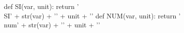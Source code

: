 \begin{pycode}
def SI(var, unit):
    return '\\SI{' + str(var) + '}{' + unit + '}'
def NUM(var, unit):
    return '\\num{' + str(var) + '}{' + unit + '}'
\end{pycode}
